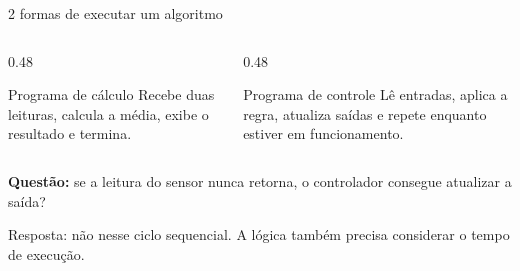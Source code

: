 \begin{frame}[t]{2 formas de executar um algoritmo}
\begin{columns}[T]
\begin{column}{0.48\textwidth}
\begin{block}{Programa de cálculo}
Recebe duas leituras, calcula a média, exibe o resultado e termina.
\end{block}
\end{column}
\begin{column}{0.48\textwidth}
\begin{block}{Programa de controle}
Lê entradas, aplica a regra, atualiza saídas e repete enquanto estiver em funcionamento.
\end{block}
\end{column}
\end{columns}
\medskip
\textbf{Questão:} se a leitura do sensor nunca retorna, o controlador consegue atualizar a saída?\par
\medskip
\small Resposta: não nesse ciclo sequencial. A lógica também precisa considerar o tempo de execução.
\end{frame}
